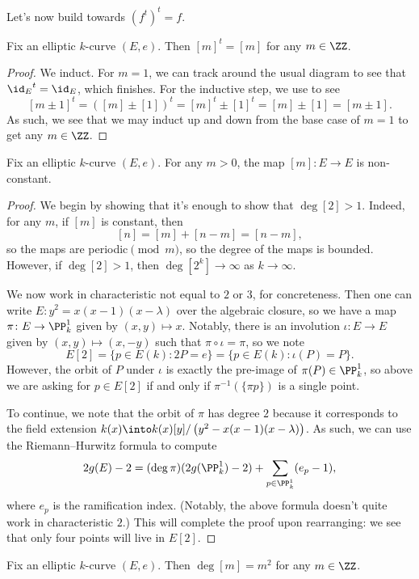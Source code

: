 \documentclass[../notes.tex]{subfiles}
\begin{document}
Let's now build towards $(f^t)^t=f$.
\begin{lemma} \label{lem:dual-mult}
	Fix an elliptic $k$-curve $(E,e)$. Then $[m]^t=[m]$ for any $m\in\ZZ$.
\end{lemma}
\begin{proof}
	We induct. For $m=1$, we can track around the usual diagram to see that ${\id_E}^t={\id_E}$, which finishes. For the inductive step, we use  to see
	\[[m\pm 1]^t=([m]\pm[1])^t=[m]^t\pm[1]^t=[m]\pm[1]=[m\pm1].\]
	As such, we see that we may induct up and down from the base case of $m=1$ to get any $m\in\ZZ$.
\end{proof}
\begin{lemma} \label{lem:mult-not-constant}
	Fix an elliptic $k$-curve $(E,e)$. For any $m>0$, the map $[m]\colon E\to E$ is non-constant.
\end{lemma}
\begin{proof}
	We begin by showing that it's enough to show that $\deg[2]>1$. Indeed, for any $m$, if $[m]$ is constant, then
	\[[n]=[m]+[n-m]=[n-m],\]
	so the maps are periodic$\pmod m$, so the degree of the maps is bounded. However, if $\deg[2]>1$, then $\deg\left[2^k\right]\to\infty$ as $k\to\infty$.

	We now work in characteristic not equal to $2$ or $3$, for concreteness. Then one can write $E\colon y^2=x(x-1)(x-\lambda)$ over the algebraic closure, so we have a map $\pi\colon E\to\PP^1_k$ given by $(x,y)\mapsto x$. Notably, there is an involution $\iota\colon E\to E$ given by $(x,y)\mapsto(x,-y)$ such that $\pi\circ\iota=\pi$, so we note
	\[E[2]=\{p\in E(k):2P=e\}=\{p\in E(k):\iota(P)=P\}.\]
	However, the orbit of $P$ under $\iota$ is exactly the pre-image of $\pi(P)\in\PP^1_k$, so above we are asking for $p\in E[2]$ if and only if $\pi^{-1}(\{\pi p\})$ is a single point.

	To continue, we note that the orbit of $\pi$ has degree $2$ because it corresponds to the field extension $k(x)\into k(x)[y]/\left(y^2-x(x-1)(x-\lambda)\right)$. As such, we can use the Riemann--Hurwitz formula to compute
	\[2g(E)-2=(\deg\pi)(2g(\PP^1_k)-2)+\sum_{p\in\PP^1_k}(e_p-1),\]
	where $e_p$ is the ramification index. (Notably, the above formula doesn't quite work in characteristic $2$.) This will complete the proof upon rearranging: we see that only four points will live in $E[2]$.
\end{proof}
\begin{corollary} \label{cor:deg-mult}
	Fix an elliptic $k$-curve $(E,e)$. Then $\deg[m]=m^2$ for any $m\in\ZZ$.
\end{corollary}
\end{document}
